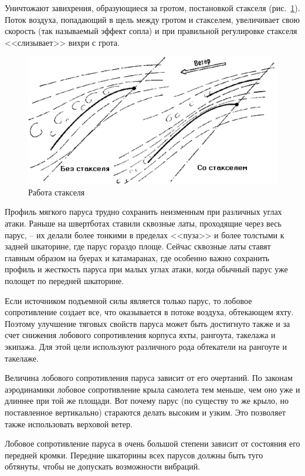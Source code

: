 \documentclass[a4paper, 12pt, twoside, final]{scrbook}
\begin{document}
Уничтожают завихрения, образующиеся за гротом, постановкой стакселя (рис.~\ref{fig:97}). Поток воздуха, попадающий в щель между гротом и стакселем, увеличивает свою скорость (так называемый эффект сопла) и при правильной регулировке стакселя <<слизывает>> вихри с грота.

\begin{figure}[htbp]
   \centering
   \includegraphics{pics/97_Rabota_stakselja} %
   \caption{Работа стакселя}
   \label{fig:97}
\end{figure}

Профиль мягкого паруса трудно сохранить неизменным при различных углах атаки. Раньше на швертботах ставили сквозные латы, проходящие через весь парус, \--- их делали более тонкими в пределах <<пуза>> и более толстыми к задней шкаторине, где парус гораздо площе. Сейчас сквозные латы ставят главным образом на буерах и катамаранах, где особенно важно сохранить профиль и жесткость паруса при малых углах атаки, когда обычный парус уже полощет по передней шкаторине.

Если источником подъемной силы является только парус, то лобовое сопротивление создает все, что оказывается в потоке воздуха, обтекающем яхту. Поэтому улучшение тяговых свойств паруса может быть достигнуто также и за счет снижения лобового сопротивления корпуса яхты, рангоута, такелажа и экипажа. Для этой цели используют различного рода обтекатели на рангоуте и такелаже.

Величина лобового сопротивления паруса зависит от его очертаний. По законам аэродинамики лобовое сопротивление крыла самолета тем меньше, чем оно уже и длиннее при той же площади. Вот почему парус (по существу то же крыло, но поставленное вертикально) стараются делать высоким и узким. Это позволяет также использовать верховой ветер.

Лобовое сопротивление паруса в очень большой степени зависит от состояния его передней кромки. Передние шкаторины всех парусов должны быть туго обтянуты, чтобы не допускать возможности вибраций.
\end{document}
